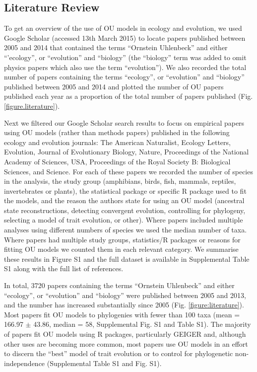 \documentclass[a4paper,12pt]{article}
\begin{document}
  \subsection{Literature Review}
  \label{section:literature.methods} 
  To get an overview of the use of OU models in ecology and evolution, we used Google Scholar (accessed 13th March 2015) to locate papers published between 2005 \citep[when the R package ouch was released;][]{Butler:2004aa} and 2014 that contained the terms ``Ornstein Uhlenbeck'' and either ``'ecology'', or ``evolution'' and ``biology'' (the ``biology'' term was added to omit physics papers which also use the term ``evolution''). We also recorded the total number of papers containing the terms ``ecology'', or ``evolution'' and ``biology'' published between 2005 and 2014 and plotted the number of OU papers published each year as a proportion of the total number of papers published (Fig. \ref{figure.literature}). 

  Next we filtered our Google Scholar search results to focus on empirical papers using OU models (rather than methods papers) published in the following ecology and evolution journals: The American Naturalist, Ecology Letters, Evolution, Journal of Evolutionary Biology, Nature, Proceedings of the National Academy of Sciences, USA, Proceedings of the Royal Society B: Biological Sciences, and Science. For each of these papers we recorded the number of species in the analysis, the study group (amphibians, birds, fish, mammals, reptiles, invertebrates or plants), the statistical package or specific R package used to fit the models, and the reason the authors state for using an OU model (ancestral state reconstructions, detecting convergent evolution, controlling for phylogeny, selecting a model of trait evolution, or other). Where papers included multiple analyses using different numbers of species we used the median number of taxa. Where papers had multiple study groups, statistics/R packages or reasons for fitting OU models we counted them in each relevant category. We summarise these results in Figure S1 and the full dataset is available in Supplemental Table S1 along with the full list of references.

  \label{section:literature.results}
  In total, 3720 papers containing the terms “Ornstein Uhlenbeck” and either “ecology”, or “evolution” and “biology” were published between 2005 and 2013, and the number has increased substantially since 2005 (Fig. \ref{figure:literature}). Most papers fit OU models to phylogenies with fewer than 100 taxa (mean = 166.97 $\pm$ 43.86, median = 58, Supplemental Fig. S1 and Table S1). The majority of papers fit OU models using R packages, particularly GEIGER and, although other uses are becoming more common, most papers use OU models in an effort to discern the “best” model of trait evolution or to control for phylogenetic non-independence (Supplemental Table S1 and Fig. S1). 
 
\end{document}
